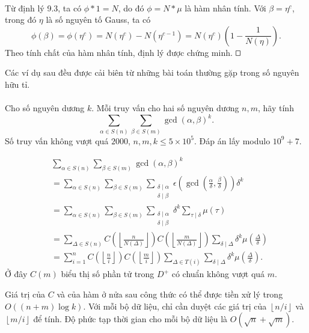 \documentclass[11pt]{article}
\newcommand{\square}{\mathord{\vcenter{\hrule height .5pt
  \hbox{\vrule width .5pt height 5pt\kern5pt\vrule width .5pt}
  \hrule height .5pt}}}
\begin{document}
\paragraph{}
Từ định lý 9.3, ta có \(\phi*1=N\), do đó \(\phi=N*\mu\) là hàm nhân tính.
Với \(\beta=\eta^c\), trong đó \(\eta\) là số nguyên tố Gauss, ta có
\[
  \phi(\beta)=\phi(\eta^c)=N(\eta^c)-N(\eta^{c-1})
  =N(\eta^c)\left(1-\frac1{N(\eta)}\right).
\]
Theo tính chất của hàm nhân tính, định lý được chứng minh. \(\square\)

Các ví dụ sau đều được cải biên từ những bài toán thường gặp trong số nguyên
hữu tỉ.

\paragraph{}
Cho số nguyên dương \(k\). Mỗi truy vấn cho hai số nguyên dương \(n,m\), hãy
tính
\[
  \sum_{\alpha\in S(n)}\sum_{\beta\in S(m)}\gcd(\alpha,\beta)^k.
\]
Số truy vấn không vượt quá \(2000\), \(n,m,k\le5\times10^5\). Đáp án lấy
modulo \(10^9+7\).

\[
\begin{aligned}
&\sum_{\alpha\in S(n)}\sum_{\beta\in S(m)}\gcd(\alpha,\beta)^k\\
&=\sum_{\alpha\in S(n)}\sum_{\beta\in S(m)}
  \sum_{\substack{\delta\mid\alpha\\\delta\mid\beta}}
  \epsilon\!\left(\gcd\!\left(\frac\alpha\delta,\frac\beta\delta\right)\right)
  \delta^k\\
&=\sum_{\alpha\in S(n)}\sum_{\beta\in S(m)}
  \sum_{\substack{\delta\mid\alpha\\\delta\mid\beta}}
  \delta^k\sum_{\tau\mid\delta}\mu(\tau)\\
&=\sum_{\Delta\in S(n)}
  C\!\left(\left\lfloor\frac n{N(\Delta)}\right\rfloor\right)
  C\!\left(\left\lfloor\frac{m}{N(\Delta)}\right\rfloor\right)
  \sum_{\delta\mid\Delta}\delta^k\mu\!\left(\frac{\Delta}{\delta}\right)\\
&=\sum_{i=1}^n
  C\!\left(\left\lfloor\frac ni\right\rfloor\right)
  C\!\left(\left\lfloor\frac mi\right\rfloor\right)
  \sum_{\Delta\in T(i)}\sum_{\delta\mid\Delta}
  \delta^k\mu\!\left(\frac{\Delta}{\delta}\right).
\end{aligned}
\]
Ở đây \(C(m)\) biểu thị số phần tử trong \(D^+\) có chuẩn không vượt quá
\(m\).

Giá trị của \(C\) và của hàm ở nửa sau công thức có thể được tiền xử lý trong
\(O((n+m)\log k)\). Với mỗi bộ dữ liệu, chỉ cần duyệt các giá trị của
\(\left\lfloor n/i\right\rfloor\) và \(\left\lfloor m/i\right\rfloor\) để
tính. Độ phức tạp thời gian cho mỗi bộ dữ liệu là \(O(\sqrt n+\sqrt m)\).
\end{document}
